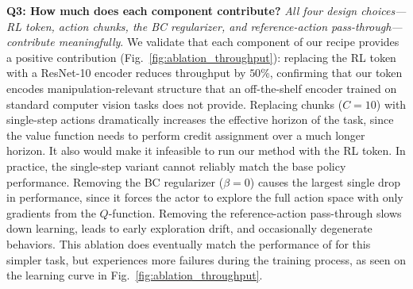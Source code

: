 \textbf{Q3: How much does each component contribute?}
\emph{All four design choices---RL token, action chunks, the BC regularizer, and reference-action pass-through---contribute meaningfully}.
We validate that each component of our recipe provides a positive contribution (Fig.~\ref{fig:ablation_throughput}): replacing the RL token with a ResNet-10 encoder reduces throughput by $50$\%, confirming that our token encodes manipulation-relevant structure that an off-the-shelf encoder trained on standard computer vision tasks does not provide. Replacing chunks ($C{=}10$) with single-step actions dramatically increases the effective horizon of the task, since the value function needs to perform credit assignment over a much longer horizon. It also would make it infeasible to run our method with the RL token. In practice, the single-step variant cannot reliably match the base policy performance. %
Removing the BC regularizer ($\beta{=}0$) causes the largest single drop in performance, since it forces the actor to explore the full action space with only gradients from the $Q$-function. Removing the reference-action pass-through slows down learning, leads to early exploration drift, and occasionally degenerate behaviors. This ablation does eventually match the performance of \MethodName{} for this simpler task, but experiences more failures during the training process, as seen on the learning curve in Fig.~\ref{fig:ablation_throughput}.


